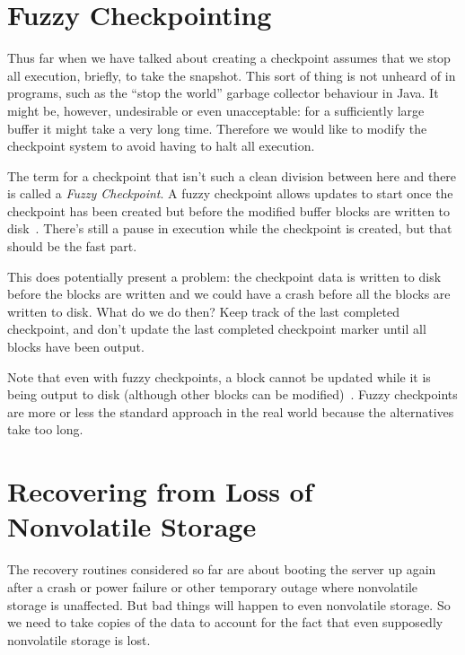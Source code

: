 




\section*{Fuzzy Checkpointing}

Thus far when we have talked about creating a checkpoint assumes that we stop all execution, briefly, to take the snapshot. This sort of thing is not unheard of in programs, such as the ``stop the world'' garbage collector behaviour in Java. It might be, however, undesirable or even unacceptable: for a sufficiently large buffer it might take a very long time. Therefore we would like to modify the checkpoint system to avoid having to halt all execution.

The term for a checkpoint that isn't such a clean division between here and there is called a \textit{Fuzzy Checkpoint}. A fuzzy checkpoint allows updates to start once the checkpoint has been created but before the modified buffer blocks are written to disk~\cite{fds}. There's still a pause in execution while the checkpoint is created, but that should be the fast part.

This does potentially present a problem: the checkpoint data is written to disk before the blocks are written and we could have a crash before all the blocks are written to disk. What do we do then? Keep track of the last completed checkpoint, and don't update the last completed checkpoint marker until all blocks have been output.

Note that even with fuzzy checkpoints, a block cannot be updated while it is being output to disk (although other blocks can be modified)~\cite{dsc}. Fuzzy checkpoints are more or less the standard approach in the real world because the alternatives take too long.

\section*{Recovering from Loss of Nonvolatile Storage}

The recovery routines considered so far are about booting the server up again after a crash or power failure or other temporary outage where nonvolatile storage is unaffected. But bad things will happen to even nonvolatile storage. So we need to take copies of the data to account for the fact that even supposedly nonvolatile storage is lost.

